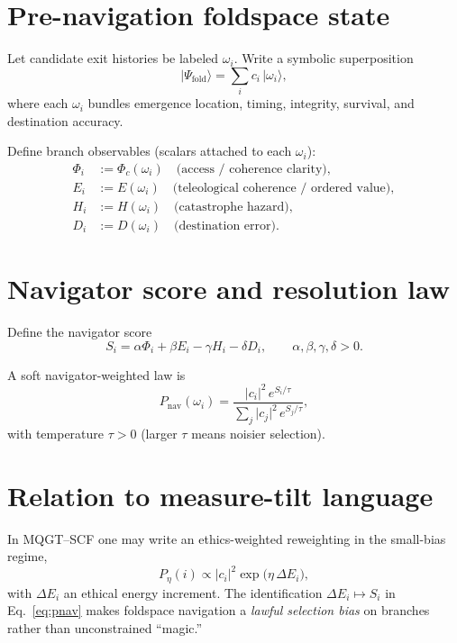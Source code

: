 \documentclass[11pt]{article}
\begin{document}
\section{Pre-navigation foldspace state}
Let candidate exit histories be labeled $\omega_i$. Write a symbolic superposition
\begin{equation}
\lvert \Psi_{\mathrm{fold}} \rangle = \sum_i c_i \, \lvert \omega_i \rangle ,
\end{equation}
where each $\omega_i$ bundles emergence location, timing, integrity, survival, and destination accuracy.

Define branch observables (scalars attached to each $\omega_i$):
\begin{align}
\Phi_i &:= \Phi_c(\omega_i) \quad \text{(access / coherence clarity)}, \\
E_i &:= E(\omega_i) \quad \text{(teleological coherence / ordered value)}, \\
H_i &:= H(\omega_i) \quad \text{(catastrophe hazard)}, \\
D_i &:= D(\omega_i) \quad \text{(destination error)}.
\end{align}

\section{Navigator score and resolution law}
Define the navigator score
\begin{equation}
S_i = \alpha \Phi_i + \beta E_i - \gamma H_i - \delta D_i , \qquad \alpha,\beta,\gamma,\delta > 0 .
\end{equation}

A soft navigator-weighted law is
\begin{equation}
P_{\mathrm{nav}}(\omega_i) = \frac{\lvert c_i \rvert^2 \, e^{S_i / \tau}}{\sum_j \lvert c_j \rvert^2 \, e^{S_j / \tau}} ,
\label{eq:pnav}
\end{equation}
with temperature $\tau>0$ (larger $\tau$ means noisier selection).

\section{Relation to measure-tilt language}
In MQGT--SCF one may write an ethics-weighted reweighting in the small-bias regime,
\begin{equation}
P_\eta(i) \propto \lvert c_i \rvert^2 \exp\!\bigl(\eta \, \Delta E_i\bigr) ,
\end{equation}
with $\Delta E_i$ an ethical energy increment. The identification $\Delta E_i \mapsto S_i$ in Eq.~\eqref{eq:pnav} makes foldspace navigation a \emph{lawful selection bias} on branches rather than unconstrained ``magic.''
\end{document}
